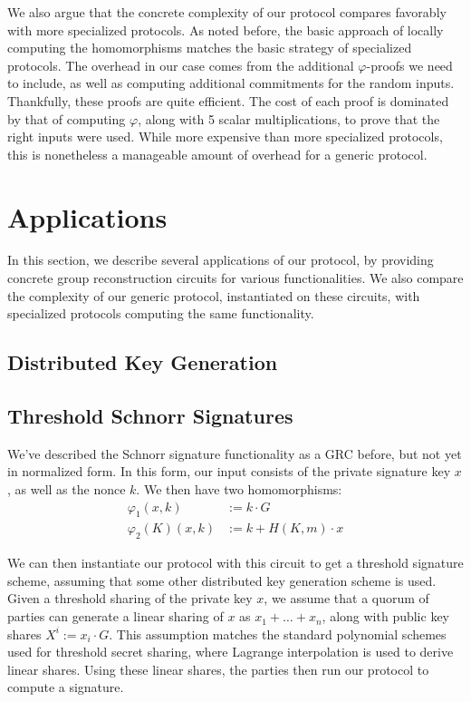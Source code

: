 We also argue that the concrete complexity of our protocol
compares favorably with more specialized protocols.
As noted before, the basic approach of locally computing
the homomorphisms matches the basic strategy of specialized protocols.
The overhead in our case comes from the additional $\varphi$-proofs
we need to include, as well as computing additional commitments
for the random inputs.
Thankfully, these proofs are quite efficient.
The cost of each proof is dominated by that of computing
$\varphi$, along with 5 scalar multiplications, to prove that
the right inputs were used.
While more expensive than more specialized protocols,
this is nonetheless a manageable amount of overhead for
a generic protocol.

\section{Applications}
\label{sec:applications}

In this section, we describe several applications of our protocol,
by providing concrete group reconstruction circuits
for various functionalities.
We also compare the complexity of our generic protocol,
instantiated on these circuits, with specialized
protocols computing the same functionality.


\subsection{Distributed Key Generation}

\subsection{Threshold Schnorr Signatures}

We've described the Schnorr signature functionality as a GRC before,
but not yet in normalized form. In this form, our input consists
of the private signature key $x$, as well as the nonce $k$.
We then have two homomorphisms:
$$
\begin{aligned}
    \varphi_1(x, k) &:= k \cdot G\\
    \varphi_2(K)(x, k) &:= k + H(K, m) \cdot x
\end{aligned}
$$

We can then instantiate our protocol with this circuit to get a
threshold signature scheme, assuming that some other distributed
key generation scheme is used.
Given a threshold sharing of the private key $x$,
we assume that a quorum of parties can generate a linear sharing
of $x$ as $x_1 + \ldots + x_n$, along with public key shares $X^i := x_i \cdot G$.
This assumption matches the standard polynomial schemes used
for threshold secret sharing, where Lagrange interpolation is used
to derive linear shares.
Using these linear shares, the parties then run our protocol
to compute a signature.

